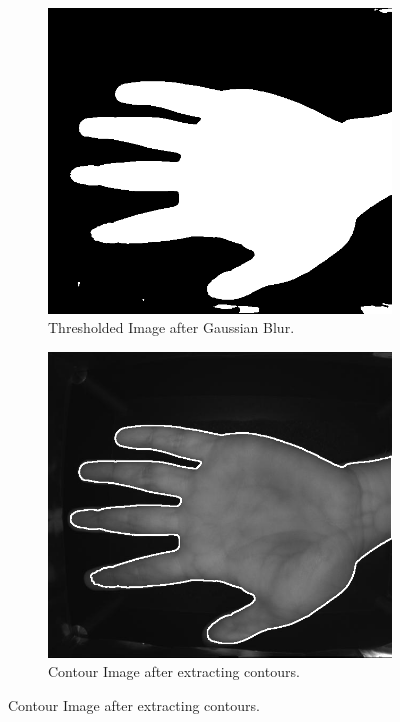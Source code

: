 \begin{enumerate}
    \begin{figure}[!ht]
        \centering
        \begin{subfigure}[t]{0.48\columnwidth}
            \includegraphics[width=\textwidth]{./images/preprocessing/thresholded_image.png}
            \caption{Thresholded Image after Gaussian Blur.} 
            \label{fig:thresholded_image}
        \end{subfigure}
        \hfill
        \begin{subfigure}[t]{0.48\columnwidth}
            \includegraphics[width=\textwidth]{./images/preprocessing/contour_image.png}
            \caption{Contour Image after extracting contours.}
            \label{fig:contour_image}
        \end{subfigure}
    \end{figure}


\end{enumerate}
